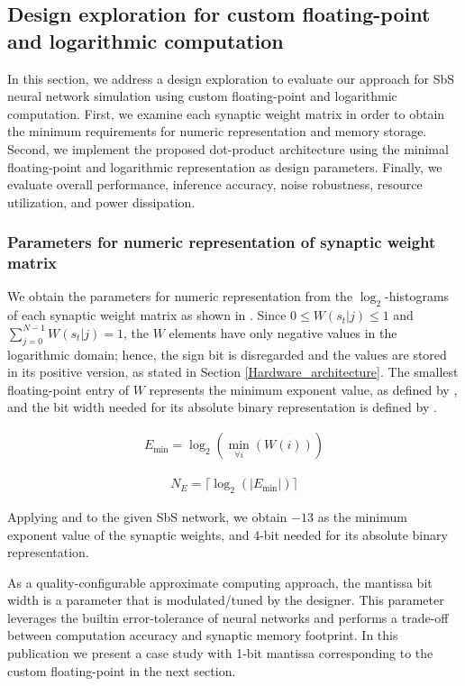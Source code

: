 \subsection{Design exploration for custom floating-point and logarithmic computation}

In this section, we address a design exploration to evaluate our approach for SbS neural network simulation using custom floating-point and logarithmic computation. First, we examine each synaptic weight matrix in order to obtain the minimum requirements for numeric representation and memory storage. Second, we implement the proposed dot-product architecture using the minimal floating-point and logarithmic representation as design parameters. Finally, we evaluate overall performance, inference accuracy, noise robustness, resource utilization, and power dissipation.

\subsubsection{Parameters for numeric representation of synaptic weight matrix}

We obtain the parameters for numeric representation from the $\log_2$-histograms of each synaptic weight matrix as shown in . Since $0\le W(s_t|j)\le1$ and $\sum_{j=0}^{N-1}W(s_t|j)=1$, the $W$ elements have only negative values in the logarithmic domain; hence, the sign bit is disregarded and the values are stored in its positive version, as stated in Section \ref{Hardware_architecture}. The smallest floating-point entry of $W$ represents the minimum exponent value, as defined by , and the bit width needed for its absolute binary representation is defined by .

\begin{eqnarray} \label{eq:exp_max}
E_{\min}=\log _2(\min_{\forall i}(W(i)))
\end{eqnarray}

\begin{eqnarray} \label{eq:bits_exp}
N_E=\lceil\log_2(|E_{\min}|)\rceil
\end{eqnarray}

Applying  and  to the given SbS network, we obtain $-13$ as the minimum exponent value of the synaptic weights, and 4-bit needed for its absolute binary representation.

As a quality-configurable approximate computing approach, the mantissa bit width is a parameter that is modulated/tuned by the designer. This parameter leverages the builtin error-tolerance of neural networks and performs a trade-off between computation accuracy and synaptic memory footprint. In this publication we present a case study with 1-bit mantissa corresponding to the custom floating-point in the next section.

